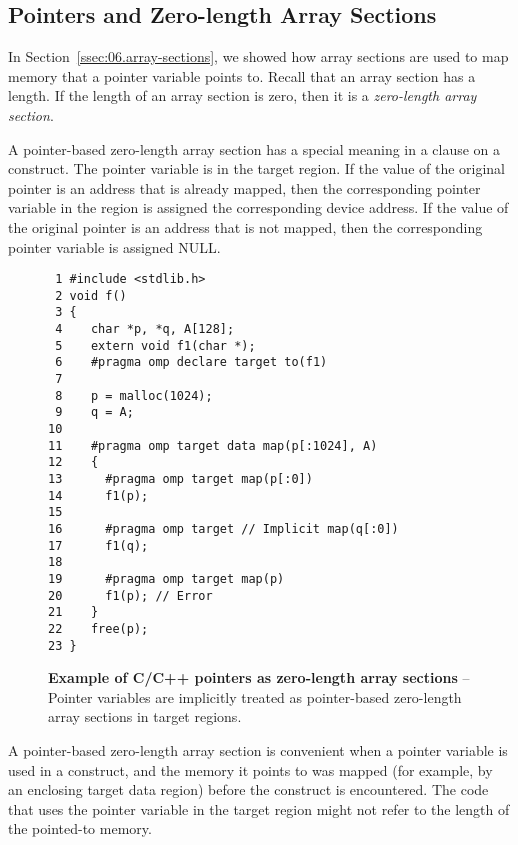 \subsection{Pointers and Zero-length Array Sections}
\label{ssec:06.zero-array-sections}

In Section~\ref{ssec:06.array-sections}, we showed how array sections are used
to map memory that a pointer variable points to.  Recall that an
array section has a length.  If the length of an array section is zero, then it
is a \emph{zero-length array section}.

A pointer-based zero-length array section has a special meaning in a
 clause on a  construct.  The pointer variable is
 in the target region.  If the value of the original pointer is
an address that is already mapped, then the corresponding  pointer variable in the
 region is assigned the corresponding device address.  If the
value of the original pointer is an address that is not mapped, then the corresponding
 pointer variable is assigned NULL.

\begin{figure*}[!tb]
\begin{verbatim}
 1 #include <stdlib.h>
 2 void f()
 3 {
 4    char *p, *q, A[128];
 5    extern void f1(char *);
 6    #pragma omp declare target to(f1) 
 7 
 8    p = malloc(1024);
 9    q = A;
10 
11    #pragma omp target data map(p[:1024], A)
12    {
13      #pragma omp target map(p[:0])
14      f1(p);
15 
16      #pragma omp target // Implicit map(q[:0])
17      f1(q);
18 
19      #pragma omp target map(p)
20      f1(p); // Error 
21    }
22    free(p);
23 }
\end{verbatim}
\caption{ \textbf {Example of C/C++ pointers as zero-length array sections} -- \small
          Pointer variables are implicitly treated as pointer-based zero-length array
          sections in target regions.
         }
\label{figure:chapter6-zerolength}
\end{figure*}

A pointer-based zero-length array section is convenient when a pointer variable is
used in a  construct, and the memory it points to was mapped (for
example, by an enclosing target data region) before the  construct is
encountered.  The code that uses the pointer variable in the target region 
might not refer to the length of the pointed-to memory.

